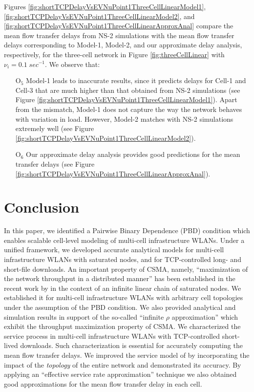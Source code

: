 \documentclass[10pt,a4paper,journal]{IEEEtran}
\theoremstyle{definition}
\theoremstyle{remark}
\theoremstyle{plain}
\begin{document}
Figures \ref{fig:shortTCPDelayVsEVNuPoint1ThreeCellLinearModel1},
\ref{fig:shortTCPDelayVsEVNuPoint1ThreeCellLinearModel2}, and
\ref{fig:shortTCPDelayVsEVNuPoint1ThreeCellLinearApproxAnal} compare
the mean flow transfer delays from NS-2 simulations with the mean flow
transfer delays corresponding to Model-1, Model-2, and our approximate
delay analysis, respectively, for the three-cell network in Figure
\ref{fig:threeCellLinear} with $\nu_i = 0.1 \; sec^{-1}$. We observe 
that: 
\begin{itemize}

\item [O$_{5}$] Model-1 leads to inaccurate results, since it 
predicts delays for Cell-1 and Cell-3 that are much higher than that 
obtained from NS-2 simulations (see Figure 
\ref{fig:shortTCPDelayVsEVNuPoint1ThreeCellLinearModel1}). Apart from 
the mismatch, Model-1 does not capture the way the network behaves with variation in load. However, 
Model-2 matches with NS-2 simulations extremely well (see Figure
\ref{fig:shortTCPDelayVsEVNuPoint1ThreeCellLinearModel2}). 

\item [O$_{6}$] Our approximate delay analysis provides good 
predictions for the mean transfer delays (see Figure 
\ref{fig:shortTCPDelayVsEVNuPoint1ThreeCellLinearApproxAnal}). 

\end{itemize}







\section{Conclusion}
\label{sec:conclusion}

In this paper, we identified a Pairwise Binary Dependence (PBD) condition which enables scalable cell-level modeling of multi-cell infrastructure WLANs. Under a unified framework, we developed accurate analytical models for multi-cell infrastructure WLANs with saturated nodes, and for TCP-controlled long- and short-file downloads. An important property of CSMA, namely, ``maximization of the network throughput in a distributed manner'' has been established in the recent work by \cite{wanet.durvy09selfOrganization} in the context of an infinite linear chain of saturated nodes. We established it for multi-cell infrastructure WLANs with arbitrary cell topologies under the assumption of the PBD condition. We also provided analytical and simulation results in support of the so-called ``infinite $\rho$ approximation'' which exhibit the throughput maximization property of CSMA. We characterized the service process in multi-cell infrastructure WLANs with TCP-controlled short-lived downloads. Such characterization is essential for accurately computing the mean flow transfer delays. We improved the service model of \cite{wanet.bonald08multicellprocsharing} by incorporating the impact of the \textit{topology} of the entire network and demonstrated its accuracy. By applying an ``effective service rate approximation'' technique we also obtained good approximations for the mean flow transfer delay in each cell. 
\end{document}
